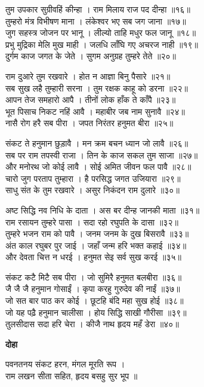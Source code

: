 तुम उपकार सुग्रीवहिं कीन्हा । राम मिलाय राज पद दीन्हा ॥१६॥\\
तुम्हरो मंत्र विभीषण माना । लंकेश्वर भए सब जग जाना ॥१७॥\\
जुग सहस्त्र जोजन पर भानू । लील्यो ताहि मधुर फल जानू ॥१८॥\\
प्रभु मुद्रिका मेलि मुख माही । जलधि लाँघि गए अचरज नाही ॥१९॥\\
दुर्गम काज जगत के जेते । सुगम अनुग्रह तुम्हरे तेते ॥२०॥

राम दुआरे तुम रखवारे । होत न आज्ञा बिनु पैसारे ॥२१॥\\
सब सुख लहै तुम्हारी सरना । तुम रक्षक काहू को डरना ॥२२॥\\
आपन तेज समहारो आपै । तीनों लोक हाँक ते काँपै ॥२३॥\\
भूत पिसाच निकट नहिं आवै । महाबीर जब नाम सुनावै ॥२४॥\\
नासै रोग हरै सब पीरा । जपत निरंतर हनुमत बीरा ॥२५॥

संकट ते हनुमान छुड़ावै । मन क्रम बचन ध्यान जो लावै ॥२६॥\\
सब पर राम तपस्वी राजा । तिन के काज सकल तुम साजा ॥२७॥\\
और मनोरथ जो कोई लावै । सोई अमित जीवन फल पावै ॥२८॥\\
चारो जुग परताप तुम्हारा । है परसिद्ध जगत उजियारा ॥२९॥\\
साधु संत के तुम रखवारे । असुर निकंदन राम दुलारे ॥३०॥

अष्ट सिद्धि नव निधि के दाता । अस बर दीन्ह जानकी माता ॥३१॥\\
राम रसायन तुम्हरे पासा । सदा रहो रघुपति के दासा ॥३२॥\\
तुम्हरे भजन राम को पावै । जनम जनम के दुख बिसरावै ॥३३॥\\
अंत काल रघुबर पुर जाई । जहाँ जन्म हरि भक्त कहाई ॥३४॥\\
और देवता चित्त न धरई । हनुमत सेइ सर्व सुख करई ॥३५॥

संकट कटै मिटै सब पीरा । जो सुमिरै हनुमत बलबीरा ॥३६॥\\
जै जै जै हनुमान गोसाईं । कृपा करहु गुरुदेव की नाईं ॥३७॥\\
जो सत बार पाठ कर कोई । छूटहि बंदि महा सुख होई ॥३८॥\\
जो यह पढ़ै हनुमान चालीसा । होय सिद्धि साखी गौरीसा ॥३९॥\\
तुलसीदास सदा हरि चेरा । कीजै नाथ हृदय महँ डेरा ॥४०॥

\vspace{1mm}

\textbf{दोहा}

पवनतनय संकट हरन, मंगल मूरति रूप ।\\
राम लखन सीता सहित, हृदय बसहु सुर भूप ॥

